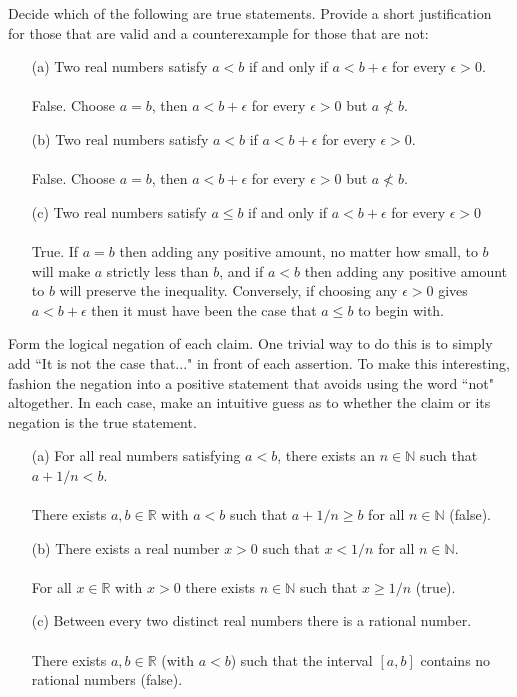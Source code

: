 \documentclass[11pt]{article}
\def\N{{\mathbb{N}}}
\def\R{{\mathbb{R}}}
\newenvironment{exer}[1]
    {\renewcommand\theinnercustomexer{#1}\innercustomexer\upshape}
    {\endinnercustomexer}
\begin{document}
\begin{exer}{1.2.10}
    Decide which of the following are true statements. Provide a short justification for those that are valid and a counterexample for those that are not:
    \begin{enumerate}
        \item[(a)]
            Two real numbers satisfy $a<b$ if and only if $a<b+\epsilon$ for every $\epsilon>0$. \\ \\
            False. Choose $a=b$, then $a<b+\epsilon$ for every $\epsilon>0$ but $a\nless b$.
        \item[(b)]
            Two real numbers satisfy $a<b$ if $a<b+\epsilon$ for every $\epsilon>0$. \\ \\
            False. Choose $a=b$, then $a<b+\epsilon$ for every $\epsilon>0$ but $a\nless b$.
        \item[(c)]
            Two real numbers satisfy $a\leq b$ if and only if $a<b+\epsilon$ for every $\epsilon>0$ \\ \\
            True. If $a=b$ then adding any positive amount, no matter how small, to $b$ will make $a$ strictly less than $b$, and if $a<b$ then adding any positive amount to $b$ will preserve the inequality. Conversely, if choosing any $\epsilon>0$ gives $a<b+\epsilon$ then it must have been the case that $a\leq b$ to begin with.
    \end{enumerate}
\end{exer}
\begin{exer}{1.2.11}
    Form the logical negation of each claim. One trivial way to do this is to simply add ``It is not the case that..." in front of each assertion. To make this interesting, fashion the negation into a positive statement that avoids using the word ``not" altogether. In each case, make an intuitive guess as to whether the claim or its negation is the true statement.
    \begin{enumerate}
        \item[(a)]
            For all real numbers satisfying $a<b$, there exists an $n\in\N$ such that $a+1/n<b$. \\ \\
            There exists $a,b\in\R$ with $a<b$ such that $a+1/n\geq b$ for all $n\in\N$ (false).
        \item[(b)]
            There exists a real number $x>0$ such that $x<1/n$ for all $n\in\N$. \\ \\
            For all $x\in\R$ with $x>0$ there exists $n\in\N$ such that $x\geq1/n$ (true).
        \item[(c)]
            Between every two distinct real numbers there is a rational number. \\ \\
            There exists $a,b\in\R$ (with $a<b$) such that the interval $[a,b]$ contains no rational numbers (false).
    \end{enumerate}
\end{exer}
\end{document}
